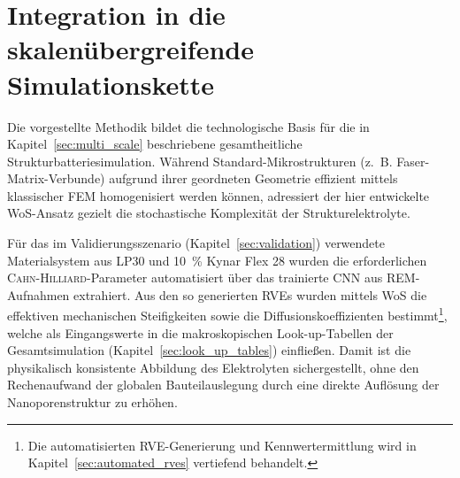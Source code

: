 \section{Integration in die skalenübergreifende Simulationskette}

Die vorgestellte Methodik bildet die technologische Basis für die in Kapitel~\ref{sec:multi_scale} beschriebene gesamtheitliche Strukturbatteriesimulation. Während Standard-Mikrostrukturen (z.~B. Faser-Matrix-Verbunde) aufgrund ihrer geordneten Geometrie effizient mittels klassischer FEM homogenisiert werden können, adressiert der hier entwickelte WoS-Ansatz gezielt die stochastische Komplexität der Strukturelektrolyte.

Für das im Validierungsszenario (Kapitel~\ref{sec:validation}) verwendete Materialsystem aus LP30 und \SI{10}{\percent} Kynar Flex 28 wurden die erforderlichen \textsc{Cahn-Hilliard}-Parameter automatisiert über das trainierte CNN aus REM-Aufnahmen extrahiert. Aus den so generierten RVEs wurden mittels WoS die effektiven mechanischen Steifigkeiten sowie die Diffusionskoeffizienten bestimmt\footnote{Die automatisierten RVE-Generierung und Kennwertermittlung wird in Kapitel~\ref{sec:automated_rves} vertiefend behandelt.}, welche als Eingangswerte in die makroskopischen Look-up-Tabellen der Gesamtsimulation (Kapitel~\ref{sec:look_up_tables}) einfließen. Damit ist die physikalisch konsistente Abbildung des Elektrolyten sichergestellt, ohne den Rechenaufwand der globalen Bauteilauslegung durch eine direkte Auflösung der Nanoporenstruktur zu erhöhen.